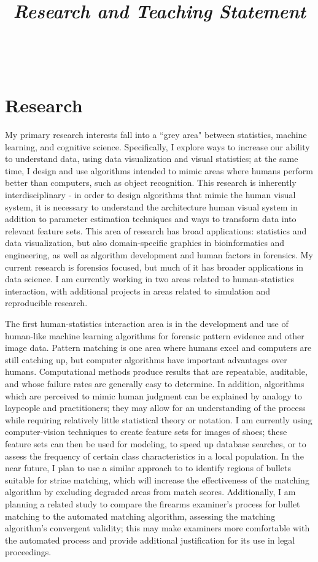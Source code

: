 \documentclass[12pt, letterpaper, sans]{moderncv}
\title{\emph{Research and Teaching Statement}}
\makeatletter
\newcommand{\makesimpletitle}{%
  \recomputeletterlengths%

  \begin{varwidth}[c]{.75\textwidth}
  \if@left\raggedright\fi%
      \if@right\raggedleft\fi%
      \ifthenelse{\equal{\@title}{}}{}{\titlestyle{\@title}}%
  \end{varwidth}\hfill
  \begin{varwidth}[c]{.25\textwidth}%
      \raggedleft%
      \addressfont\textcolor{color2}{%
        {\bfseries\upshape\@firstname~\@lastname}\\
        \ifthenelse{\isundefined{\@addressstreet}}{}{\makenewline\addresssymbol\@addressstreet%
          \ifthenelse{\equal{\@addresscity}{}}{}{\makenewline\@addresscity}%
          \ifthenelse{\equal{\@addresscountry}{}}{}{\makenewline\@addresscountry}}%
        \collectionloop{phones}{%
          \makenewline\csname\collectionloopkey phonesymbol\endcsname\collectionloopitem}%
        \ifthenelse{\isundefined{\@email}}{}{\makenewline\emailsymbol\emaillink{\@email}}%
        \ifthenelse{\isundefined{\@homepage}}{}{\makenewline\homepagesymbol\httplink{\@homepage}}%
        \ifthenelse{\isundefined{\@extrainfo}}{}{\makenewline\@extrainfo}}
    \end{varwidth}
}
\makeatother
\begin{document}
\makesimpletitle

\section{Research}

My primary research interests fall into a ``grey area" between statistics, machine learning, and cognitive science. Specifically, I explore ways to increase our ability to understand data, using data visualization and visual statistics; at the same time, I design and use algorithms intended to mimic areas where humans perform better than computers, such as object recognition. This research is inherently interdisciplinary - in order to design algorithms that mimic the human visual system, it is necessary to understand the architecture human visual system in addition to parameter estimation techniques and ways to transform data into relevant feature sets. This area of research has broad applications: statistics and data visualization, but also domain-specific graphics in bioinformatics and engineering, as well as algorithm development and human factors in forensics. My current research is forensics focused, but much of it has broader applications in data science. I am currently working in two areas related to human-statistics interaction, with additional projects in areas related to simulation and reproducible research. 

The first human-statistics interaction area is in the development and use of human-like machine learning algorithms for forensic pattern evidence and other image data. Pattern matching is one area where humans excel and computers are still catching up, but computer algorithms have important advantages over humans. Computational methods produce results that are repeatable, auditable, and whose failure rates are generally easy to determine. In addition, algorithms which are perceived to mimic human judgment can be explained by analogy to laypeople and practitioners; they may allow for an understanding of the process while requiring relatively little statistical theory or notation. I am currently using computer-vision techniques to create feature sets for images of shoes; these feature sets can then be used for modeling, to speed up database searches, or to assess the frequency of certain class characteristics in a local population. In the near future, I plan to use a similar approach to to identify regions of bullets suitable for striae matching, which will increase the effectiveness of the matching algorithm by excluding degraded areas from match scores. Additionally, I am planning a related study to compare the firearms examiner's process for bullet matching to the automated matching algorithm, assessing the matching algorithm's convergent validity; this may make examiners more comfortable with the automated process and provide additional justification for its use in legal proceedings. 
\end{document}
